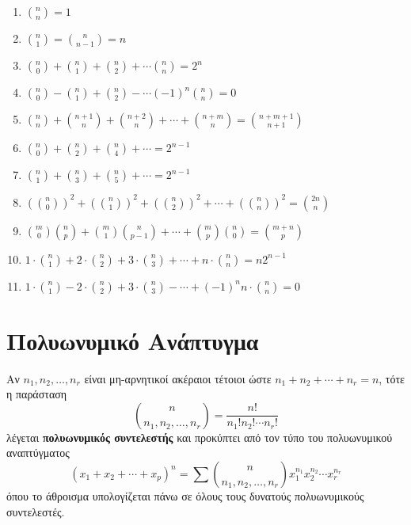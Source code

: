 \begin{enumerate}
\item $\binom{n}{n}=1$
\item $\binom{n}{1}=\binom{n}{n-1}=n$
\item $\binom{n}{0}+\binom{n}{1}+\binom{n}{2}+\cdots\binom{n}{n}=2^{n}$
\item $\binom{n}{0}-\binom{n}{1}+\binom{n}{2}-\cdots (-1)^{n}\binom{n}{n}=0$
\item $\binom{n}{n}+\binom{n+1}{n}+\binom{n+2}{n}+\cdots+\binom{n+m}{n}=\binom{n+m+1}{n+1}$
\item $\binom{n}{0}+\binom{n}{2}+\binom{n}{4}+\cdots=2^{n-1}$
\item $\binom{n}{1}+\binom{n}{3}+\binom{n}{5}+\cdots=2^{n-1}$
\item $(\binom{n}{0})^{2}+(\binom{n}{1})^{2}+(\binom{n}{2})^{2}+\cdots+(\binom{n}{n})^{2}=\binom{2n}{n}$
\item $\binom{m}{0}\binom{n}{p}+\binom{m}{1}\binom{n}{p-1}+\cdots+\binom{m}{p}\binom{n}{0}=\binom{m+n}{p}$
\item $1\cdot\binom{n}{1}+2\cdot\binom{n}{2}+3\cdot\binom{n}{3}+\cdots+n\cdot\binom{n}{n}=n2^{n-1}$
\item $1\cdot\binom{n}{1}-2\cdot\binom{n}{2}+3\cdot\binom{n}{3}-\cdots+(-1)^{n}n\cdot\binom{n}{n}=0$
\end{enumerate}

\section{Πολυωνυμικό Ανάπτυγμα}

Αν $n_{1}, n_{2}, \ldots, n_{r}$ είναι μη-αρνητικοί ακέραιοι τέτοιοι ώστε $n_{1}+n_{2}+\cdots+n_{r}=n$, τότε η παράσταση
\[
\binom{n}{n_{1},n_{2},\ldots,n_{r}}=\frac{n!}{n_{1}! n_{2}! \cdots n_{r}!}
\]
λέγεται \textbf{\color{blue} πολυωνυμικός συντελεστής} και προκύπτει από τον τύπο του πολυωνυμικού αναπτύγματος
\[
(x_{1}+x_{2}+\cdots+x_{p})^{n}=\sum\binom{n}{n_{1},n_{2},\ldots,n_{r}}x_{1}^{n_{1}}x_{2}^{n_{2}}\cdots x_{r}^{n_{r}}
\]
όπου το άθροισμα υπολογίζεται πάνω σε όλους τους δυνατούς πολυωνυμικούς συντελεστές.

